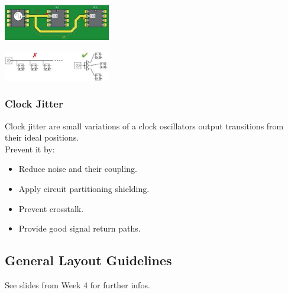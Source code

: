 		\begin{center}\includegraphics[width=0.35\textwidth]{images/ClockSkew.png}\end{center} 
		\begin{center}\includegraphics[width=0.35\textwidth]{images/ClockSkewGoodBad.png}\end{center} 
		
		\subsubsection{Clock Jitter}
		Clock jitter are small variations of a clock oscillators output transitions from their ideal positions. \\
		Prevent it by: 
		\begin{itemize}
				\setlength{\itemsep}{-4pt}
				\item Reduce noise and their coupling. 
				\item Apply circuit partitioning shielding. 
				\item Prevent crosstalk. 
				\item Provide good signal return paths. 
		\end{itemize}

	\subsection{General Layout Guidelines}
		See slides from Week 4 for further infos. 

